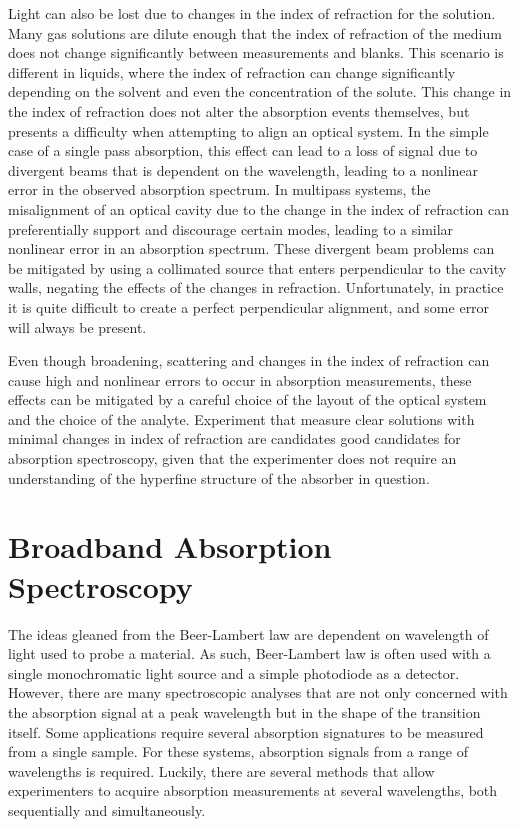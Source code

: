 Light can also be lost due to changes in the index of refraction for the
solution. Many gas solutions are dilute enough that the index of refraction of
the medium does not change significantly between measurements and blanks. This
scenario is different in liquids, where the index of refraction can change
significantly depending on the solvent and even the concentration of the
solute. This change in the index of refraction does not alter the absorption
events themselves, but presents a difficulty when attempting to align an
optical system. In the simple case of a single pass absorption, this effect can
lead to a loss of signal due to divergent beams that is dependent on the
wavelength, leading to a nonlinear error in the observed absorption spectrum.
In multipass systems, the misalignment of an optical cavity due to the change
in the index of refraction can preferentially support and discourage certain
modes, leading to a similar nonlinear error in an absorption spectrum. These
divergent beam problems can be mitigated by using a collimated source that
enters perpendicular to the cavity walls, negating the effects of the changes
in refraction. Unfortunately, in practice it is quite difficult to create a
perfect perpendicular alignment, and some error will always be present.

Even though broadening, scattering and changes in the index of refraction can
cause high and nonlinear errors to occur in absorption measurements, these
effects can be mitigated by a careful choice of the layout of the optical
system and the choice of the analyte. Experiment that measure clear solutions
with minimal changes in index of refraction are candidates good candidates for
absorption spectroscopy, given that the experimenter does not require an
understanding of the hyperfine structure of the absorber in question.

\section{Broadband Absorption Spectroscopy}\label{sec:broad_abs}

The ideas gleaned from the Beer-Lambert law are dependent on wavelength of
light used to probe a material. As such, Beer-Lambert law is often used with a
single monochromatic light source and a simple photodiode as a detector.
However, there are many spectroscopic analyses that are not only concerned with
the absorption signal at a peak wavelength but in the shape of the transition
itself. Some applications require several absorption signatures to be measured
from a single sample. For these systems, absorption signals from a range of
wavelengths is required. Luckily, there are several methods that allow
experimenters to acquire absorption measurements at several wavelengths, both
sequentially and simultaneously.


